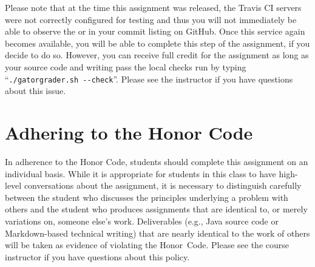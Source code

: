 \documentclass[11pt]{article}
\newcommand{\gatorgradercheck}{\command{./gatorgrader.sh --check}}
\newcommand{\command}[1]{``\lstinline{#1}''}
\newcommand{\checkmark}{\ding{51}}
\newcommand{\naughtmark}{\ding{55}}
\begin{document}
Please note that at the time this assignment was released, the Travis CI servers were not correctly configured for
testing and thus you will not immediately be able to observe the \checkmark{} or \naughtmark{} in your commit listing on
GitHub. Once this service again becomes available, you will be able to complete this step of the assignment, if you
decide to do so. However, you can receive full credit for the assignment as long as your source code and writing pass
the local checks run by typing \gatorgradercheck{}. Please see the instructor if you have questions about this issue.

\section*{Adhering to the Honor Code}

In adherence to the Honor Code, students should complete this assignment on an individual basis. While it is appropriate
for students in this class to have high-level conversations about the assignment, it is necessary to distinguish
carefully between the student who discusses the principles underlying a problem with others and the student who produces
assignments that are identical to, or merely variations on, someone else's work. Deliverables (e.g., Java source code or
Markdown-based technical writing) that are nearly identical to the work of others will be taken as evidence of violating
the \mbox{Honor Code}. Please see the course instructor if you have questions about this policy.
\end{document}
